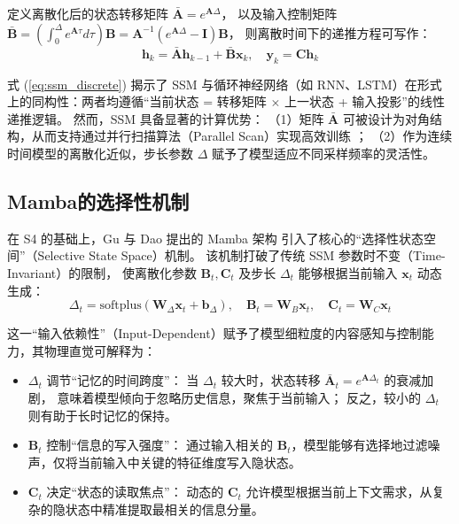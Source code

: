定义离散化后的状态转移矩阵 $\bar{\mathbf{A}} = e^{\mathbf{A}\Delta}$，
以及输入控制矩阵 $\bar{\mathbf{B}} = \left(\int_0^{\Delta} e^{\mathbf{A}\tau} d\tau \right) \mathbf{B} = \mathbf{A}^{-1}(e^{\mathbf{A}\Delta} - \mathbf{I})\mathbf{B}$，
则离散时间下的递推方程可写作：
\begin{equation}
  \mathbf{h}_k = \bar{\mathbf{A}} \mathbf{h}_{k-1} + \bar{\mathbf{B}} \mathbf{x}_k, \quad \mathbf{y}_k = \mathbf{C} \mathbf{h}_k
  \label{eq:ssm_discrete}
\end{equation}

式 (\ref{eq:ssm_discrete}) 揭示了 SSM 与循环神经网络（如 RNN、LSTM）在形式上的同构性：两者均遵循“当前状态 = 转移矩阵 $\times$ 上一状态 + 输入投影”的线性递推逻辑。
然而，SSM 具备显著的计算优势：
（1）矩阵 $\bar{\mathbf{A}}$ 可被设计为对角结构，从而支持通过并行扫描算法（Parallel Scan）实现高效训练 \cite{Gu2022S4}；
（2）作为连续时间模型的离散化近似，步长参数 $\Delta$ 赋予了模型适应不同采样频率的灵活性。

\subsection{Mamba的选择性机制}

在 S4 的基础上，Gu 与 Dao 提出的 Mamba 架构 \cite{Gu2023Mamba} 引入了核心的“选择性状态空间”（Selective State Space）机制。
该机制打破了传统 SSM 参数时不变（Time-Invariant）的限制，
使离散化参数 $\mathbf{B}_t, \mathbf{C}_t$ 及步长 $\Delta_t$ 能够根据当前输入 $\mathbf{x}_t$ 动态生成：
\begin{equation}
  \Delta_t = \text{softplus}(\mathbf{W}_\Delta \mathbf{x}_t + \mathbf{b}_\Delta), \quad
  \mathbf{B}_t = \mathbf{W}_B \mathbf{x}_t, \quad
  \mathbf{C}_t = \mathbf{W}_C \mathbf{x}_t
  \label{eq:mamba_selective}
\end{equation}

这一“输入依赖性”（Input-Dependent）赋予了模型细粒度的内容感知与控制能力，其物理直觉可解释为：

\begin{itemize}
  \item $\Delta_t$ 调节“记忆的时间跨度”：
    当 $\Delta_t$ 较大时，状态转移 $\bar{\mathbf{A}}_t = e^{\mathbf{A}\Delta_t}$ 的衰减加剧，
    意味着模型倾向于忽略历史信息，聚焦于当前输入；
    反之，较小的 $\Delta_t$ 则有助于长时记忆的保持。
  \item $\mathbf{B}_t$ 控制“信息的写入强度”：
    通过输入相关的 $\mathbf{B}_t$，模型能够有选择地过滤噪声，仅将当前输入中关键的特征维度写入隐状态。
  \item $\mathbf{C}_t$ 决定“状态的读取焦点”：
    动态的 $\mathbf{C}_t$ 允许模型根据当前上下文需求，从复杂的隐状态中精准提取最相关的信息分量。
\end{itemize}

